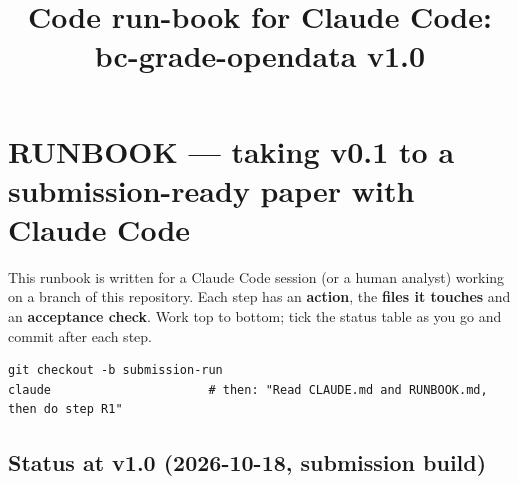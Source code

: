 \documentclass[
  10pt,
]{article}
\title{Code run-book for Claude Code: bc-grade-opendata v1.0}
\author{}
\date{}
\begin{document}
\maketitle

{
\hypersetup{linkcolor=}
\setcounter{tocdepth}{3}
\tableofcontents
}
\hypertarget{runbook-taking-v0.1-to-a-submission-ready-paper-with-claude-code}{%
\section{RUNBOOK --- taking v0.1 to a submission-ready paper with Claude
Code}\label{runbook-taking-v0.1-to-a-submission-ready-paper-with-claude-code}}

This runbook is written for a Claude Code session (or a human analyst)
working on a branch of this repository. Each step has an
\textbf{action}, the \textbf{files it touches} and an \textbf{acceptance
check}. Work top to bottom; tick the status table as you go and commit
after each step.

\begin{verbatim}
git checkout -b submission-run
claude                      # then: "Read CLAUDE.md and RUNBOOK.md, then do step R1"
\end{verbatim}

\hypertarget{status-at-v1.0-2026-10-18-submission-build}{%
\subsection{Status at v1.0 (2026-10-18, submission
build)}\label{status-at-v1.0-2026-10-18-submission-build}}
\end{document}
